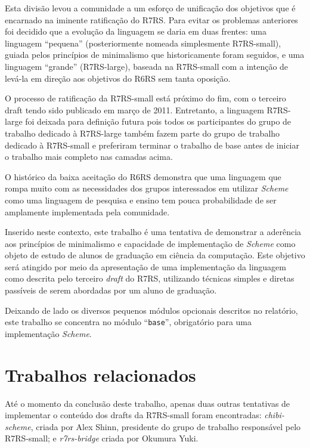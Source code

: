 Esta divisão levou a comunidade a um esforço de unificação dos objetivos que
é encarnado na iminente ratificação do \acs{R7RS}. Para evitar os
problemas anteriores foi decidido que a evolução da linguagem se daria em duas
frentes: uma linguagem ``pequena'' (posteriormente nomeada simplesmente
\acs{R7RS}-small), guiada pelos princípios de minimalismo que historicamente
foram seguidos, e uma linguagem ``grande'' (\acs{R7RS}-large), baseada na
R7RS-small com a intenção de levá-la em direção aos objetivos do \acs{R6RS}
sem tanta oposição\cite{r7rs-steering-committee-position}. 

O processo de ratificação da \acs{R7RS}-small está próximo do fim, com o terceiro
draft tendo sido publicado em março de 2011\cite{r7rs-draft3}. Entretanto, a linguagem
\acs{R7RS}-large foi deixada para definição futura pois todos os
participantes do grupo de trabalho dedicado à \acs{R7RS}-large também fazem
parte do grupo de trabalho dedicado à \acs{R7RS}-small e preferiram terminar o
trabalho de base antes de iniciar o trabalho mais completo nas camadas acima.

O histórico da baixa aceitação do \acs{R6RS} demonstra que uma linguagem que
rompa muito com as necessidades dos grupos interessados em utilizar
\textit{Scheme} como uma linguagem de pesquisa e ensino tem pouca probabilidade
de ser amplamente implementada pela comunidade.

Inserido neste contexto, este trabalho é uma tentativa de demonstrar a
aderência aos princípios de minimalismo e capacidade de implementação de
\textit{Scheme} como objeto de estudo de alunos de graduação em ciência da
computação. Este objetivo será atingido por meio da apresentação de uma
implementação  da linguagem como descrita pelo terceiro \textit{draft} do
\acs{R7RS}, utilizando técnicas simples e diretas passíveis de serem abordadas
por um aluno de graduação.

Deixando de lado os diversos pequenos módulos opcionais descritos no relatório,
este trabalho se concentra no módulo ``\texttt{base}'', obrigatório para uma
implementação \textit{Scheme}.


\section{Trabalhos relacionados}
\label{sec:trabalhos_relacionados}

Até o momento da conclusão deste trabalho, apenas duas outras tentativas de
implementar o conteúdo dos drafts da \acs{R7RS}-small foram encontradas:
\textit{chibi-scheme}, criada por Alex Shinn, presidente do grupo de trabalho
responsável pelo \acs{R7RS}-small\cite{chibi}; e \textit{r7rs-bridge} criada por
Okumura Yuki\cite{r7rs-bridge}.

